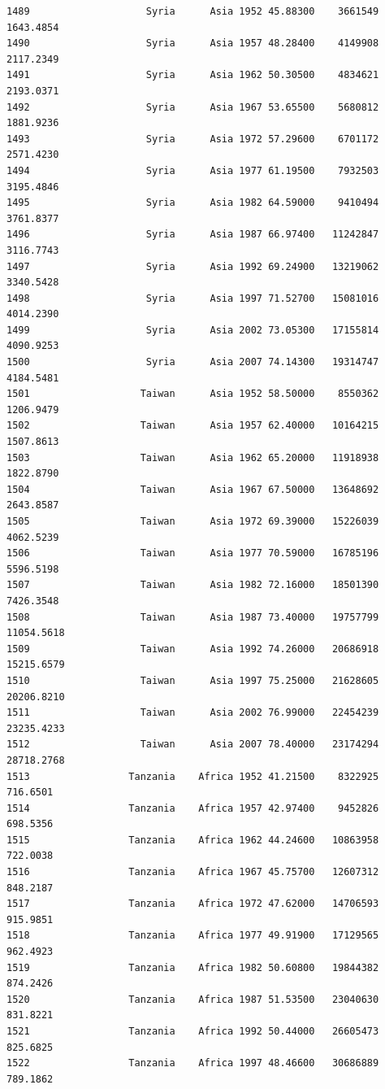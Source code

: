 \documentclass[
  letterpaper,
  DIV=11,
  numbers=noendperiod]{scrreprt}
\begin{document}
\begin{verbatim}
1489                    Syria      Asia 1952 45.88300    3661549   1643.4854
1490                    Syria      Asia 1957 48.28400    4149908   2117.2349
1491                    Syria      Asia 1962 50.30500    4834621   2193.0371
1492                    Syria      Asia 1967 53.65500    5680812   1881.9236
1493                    Syria      Asia 1972 57.29600    6701172   2571.4230
1494                    Syria      Asia 1977 61.19500    7932503   3195.4846
1495                    Syria      Asia 1982 64.59000    9410494   3761.8377
1496                    Syria      Asia 1987 66.97400   11242847   3116.7743
1497                    Syria      Asia 1992 69.24900   13219062   3340.5428
1498                    Syria      Asia 1997 71.52700   15081016   4014.2390
1499                    Syria      Asia 2002 73.05300   17155814   4090.9253
1500                    Syria      Asia 2007 74.14300   19314747   4184.5481
1501                   Taiwan      Asia 1952 58.50000    8550362   1206.9479
1502                   Taiwan      Asia 1957 62.40000   10164215   1507.8613
1503                   Taiwan      Asia 1962 65.20000   11918938   1822.8790
1504                   Taiwan      Asia 1967 67.50000   13648692   2643.8587
1505                   Taiwan      Asia 1972 69.39000   15226039   4062.5239
1506                   Taiwan      Asia 1977 70.59000   16785196   5596.5198
1507                   Taiwan      Asia 1982 72.16000   18501390   7426.3548
1508                   Taiwan      Asia 1987 73.40000   19757799  11054.5618
1509                   Taiwan      Asia 1992 74.26000   20686918  15215.6579
1510                   Taiwan      Asia 1997 75.25000   21628605  20206.8210
1511                   Taiwan      Asia 2002 76.99000   22454239  23235.4233
1512                   Taiwan      Asia 2007 78.40000   23174294  28718.2768
1513                 Tanzania    Africa 1952 41.21500    8322925    716.6501
1514                 Tanzania    Africa 1957 42.97400    9452826    698.5356
1515                 Tanzania    Africa 1962 44.24600   10863958    722.0038
1516                 Tanzania    Africa 1967 45.75700   12607312    848.2187
1517                 Tanzania    Africa 1972 47.62000   14706593    915.9851
1518                 Tanzania    Africa 1977 49.91900   17129565    962.4923
1519                 Tanzania    Africa 1982 50.60800   19844382    874.2426
1520                 Tanzania    Africa 1987 51.53500   23040630    831.8221
1521                 Tanzania    Africa 1992 50.44000   26605473    825.6825
1522                 Tanzania    Africa 1997 48.46600   30686889    789.1862

\end{verbatim}
\end{document}
